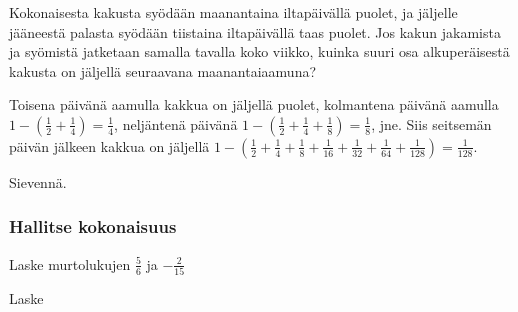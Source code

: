 \begin{tehtavasivu}
\begin{tehtava}
	Kokonaisesta kakusta syödään maanantaina iltapäivällä puolet, ja jäljelle jääneestä palasta syödään tiistaina iltapäivällä taas puolet. Jos kakun jakamista ja syömistä jatketaan samalla tavalla koko viikko, kuinka suuri osa alkuperäisestä kakusta on jäljellä seuraavana maanantaiaamuna?
	\begin{vastaus}
		Toisena päivänä aamulla kakkua on jäljellä puolet, kolmantena päivänä aamulla
		$1-\left(\frac{1}{2} + \frac{1}{4}\right) = \frac{1}{4}$, 
		neljäntenä päivänä
		$1-\left(\frac{1}{2} + \frac{1}{4} + \frac{1}{8}\right)
		= \frac{1}{8}$, jne.
		Siis seitsemän päivän jälkeen kakkua on jäljellä
		$1-\left(\frac{1}{2} + \frac{1}{4} + \frac{1}{8} +
		\frac{1}{16} + \frac{1}{32} + \frac{1}{64} + \frac{1}{128}\right)
		= \frac{1}{128}$.  
	\end{vastaus}
\end{tehtava}

\begin{tehtava}
Sievennä.
	\begin{vastaus}
	\end{vastaus}
\end{tehtava}

\subsubsection*{Hallitse kokonaisuus}

\begin{tehtava}
Laske murtolukujen $\frac{5}{6}$ ja $-\frac{2}{15}$
	\begin{vastaus}
	\end{vastaus}
\end{tehtava}

\begin{tehtava} Laske
	\begin{vastaus}
	\end{vastaus}
\end{tehtava}


\end{tehtavasivu}
